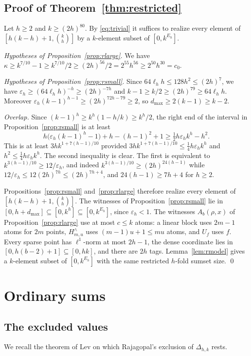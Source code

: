 \documentclass[11pt]{amsart}
\theoremstyle{definition}
\theoremstyle{remark}
\numberwithin{equation}{section}
\begin{document}
\subsection{Proof of Theorem~\ref{thm:restricted}}

Let $h\ge 2$ and $k\ge(2h)^{80}$. By \eqref{eq:trivial} it suffices to realize every element of $[h(k-h)+1,\binom kh]$ by a $k$-element subset of $[0,k^{E_h}]$.

\emph{Hypotheses of Proposition~\ref{prop:rlarge}.} We have $\kappa\ge k^{7/10}-1\ge k^{7/10}/2\ge(2h)^{56}/2=2^{55}h^{56}\ge 2^{50}h^{30}=c_0$.

\emph{Hypotheses of Proposition~\ref{prop:rsmall}.} Since $64\ell_hh\le 128h^2\le(2h)^7$, we have $\varepsilon_h\ge(64\ell_hh)^{-h}\ge(2h)^{-7h}$ and $k-1\ge k/2\ge(2h)^{79}\ge 64\ell_hh$. Moreover $\varepsilon_h(k-1)^{h-1}\ge(2h)^{72h-79}\ge 2$, so $d_{\max}\ge 2(k-1)\ge k-2$.

\emph{Overlap.} Since $(k-1)^h\ge k^h(1-h/k)\ge k^h/2$, the right end of the interval in Proposition~\ref{prop:rsmall} is at least
\[
h\bigl(\varepsilon_h(k-1)^h-1\bigr)+h-(h-1)^2+1\ge\tfrac12h\varepsilon_hk^h-h^2 .
\]
This is at least $3hk^{1+7(h-1)/10}$ provided $3hk^{1+7(h-1)/10}\le\frac14h\varepsilon_hk^h$ and $h^2\le\frac14h\varepsilon_hk^h$. The second inequality is clear. The first is equivalent to $k^{3(h-1)/10}\ge 12/\varepsilon_h$, and indeed $k^{3(h-1)/10}\ge(2h)^{24(h-1)}$ while $12/\varepsilon_h\le 12(2h)^{7h}\le(2h)^{7h+4}$, and $24(h-1)\ge 7h+4$ for $h\ge 2$.

Propositions~\ref{prop:rsmall} and~\ref{prop:rlarge} therefore realize every element of $[h(k-h)+1,\binom kh]$. The witnesses of Proposition~\ref{prop:rsmall} lie in $[0,h+d_{\max}]\subseteq[0,k^h]\subseteq[0,k^{E_h}]$, since $\varepsilon_h<1$. The witnesses $A_b(\rho,x)$ of Proposition~\ref{prop:rlarge} use at most $c\le k$ atoms: a linear block uses $2m-1$ atoms for $2m$ points, $H^\wedge_{m,u}$ uses $(m-1)u+1\le mu$ atoms, and $U_f$ uses $f$. Every sparse point has $\ell^1$-norm at most $2h-1$, the dense coordinate lies in $[0,h(b-2)+1]\subseteq[0,hk]$, and there are $2h$ tags. Lemma~\ref{lem:rmodel} gives a $k$-element subset of $[0,k^{E_h}]$ with the same restricted $h$-fold sumset size. \qed

\section{Ordinary sums}\label{sec:ordinary}

\subsection{The excluded values}\label{sec:exclusion}
We recall the theorem of Lev on which Rajagopal's exclusion of $\Delta_{h,k}$ rests.
\end{document}
